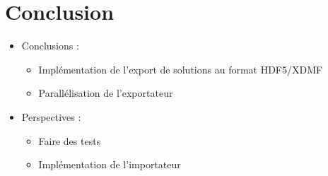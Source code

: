 \documentclass{beamer}
\begin{document}
\section{Conclusion}
\begin{frame}
\begin{itemize}
\item Conclusions :
\begin{itemize}
\item Implémentation de l'export de solutions au format HDF5/XDMF
\item Parallélisation de l'exportateur
\end{itemize}
\item Perspectives :
\begin{itemize}
\item Faire des tests
\item Implémentation de l'importateur
\end{itemize}
\end{itemize}
\end{frame}
\end{document}
